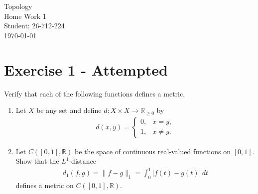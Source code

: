 \documentclass[12pt]{article}
\begin{document}
\begin{titlepage}

\centering

\vspace*{\fill} %

{\Huge Topology} \\[0.5cm] %

{\Huge Home Work 1}\\[1.5cm] %

{\Large Student: 26-712-224}\\[0.5cm] %

{\Large \today} %

\vspace*{\fill}

\end{titlepage}

\newpage

\noindent

\section*{Exercise 1 - Attempted}

\noindent

Verify that each of the following functions defines a metric.

\begin{enumerate}[label=\alph*)]

\item Let $X$ be any set and define $d:X\times X\to\mathbb{R}_{\geq 0}$ by
\begin{align*}
d(x,y)=
\begin{cases}
0, & x=y,\\
1, & x\neq y.
\end{cases}
\end{align*}

\item Let $C([0,1],\mathbb{R})$ be the space of continuous real-valued functions on $[0,1]$. Show that the $L^1$-distance
\begin{align*}
d_1(f,g)=\|f-g\|_1=\int_0^1 |f(t)-g(t)|\,dt
\end{align*}
defines a metric on $C([0,1],\mathbb{R})$.
\end{enumerate}
\end{document}
